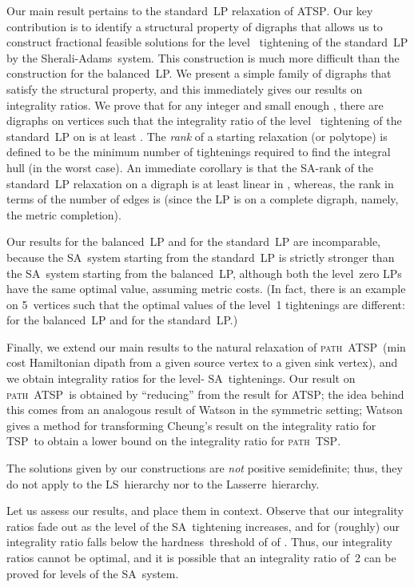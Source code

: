 \documentclass[11pt]{article}
\newcommand{\sa}{\textsf{Sherali-Adams}}
\newcommand{\la}{\textsf{Lasserre}}
\newcommand{\iLSp}{\textsf{LS}}
\newcommand{\iSA}{\textsf{SA}}
\newcommand{\tsp}{\textsc{TSP}}
\newcommand{\atsp}{\textsc{ATSP}}
\newcommand{\pathtsp}{\textsc{path~TSP}}
\newcommand{\pathatsp}{\textsc{path~ATSP}}
\begin{document}
Our main result pertains to the standard~LP relaxation of \atsp.
Our key contribution is to identify
a structural property of digraphs that
allows us to construct fractional feasible solutions
for the level~ tightening of the standard~LP by the \sa\ system.
This construction is much more difficult than the
construction for the balanced~LP.
We present a simple family of digraphs that
satisfy the structural property, and this immediately
gives our results on integrality ratios.
We prove that for any integer  and small enough ,
there are digraphs  on  vertices
such that the integrality ratio of
the level~ tightening of the standard~LP on 
is at least .
The \textit{rank} of a starting relaxation (or polytope)
is defined to be the minimum number of tightenings
required to find the integral hull (in the worst case).
An immediate corollary is that
the \iSA-rank of the standard~LP relaxation on a digraph 
is at least linear in , whereas,
the rank in terms of the number of edges is 
(since the LP is on a complete digraph, namely, the metric completion).

Our results for the balanced~LP and for the standard~LP
are incomparable, because
the \iSA\ system starting from the standard~LP
is strictly stronger than
the \iSA\ system starting from the balanced~LP,
although both the level~zero LPs have the
same optimal value, assuming metric costs.
(In fact, there is an example on 5~vertices
\cite[Figure~4.4,~p.60]{paulthesis08} such that
the optimal values of the level~1 tightenings are different:
 for the balanced~LP and  for the standard~LP.)

Finally, we extend our main results to the natural relaxation of
\pathatsp\ (min cost Hamiltonian dipath from a given source vertex to a
given sink vertex), and
we obtain integrality ratios  for the level-
\iSA\ tightenings.
Our result on \pathatsp\ is obtained by ``reducing'' from the result
for \atsp; the idea behind this comes from an analogous result of
Watson \cite{watson11} in the symmetric setting; Watson gives a method
for transforming Cheung's \cite{cheung05} result on the integrality
ratio for \tsp\ to obtain a lower bound on the integrality ratio for
\pathtsp.


The solutions given by our constructions are \textit{not}
positive semidefinite;
thus, they do not apply to the \iLSp\ hierarchy
nor to the \la\ hierarchy.

Let us assess our results, and place them in context.
Observe that our integrality ratios fade out as the
level of the \iSA\ tightening increases,
and for  (roughly)
our integrality ratio falls below the hardness~threshold of
 of \cite{KLS-isaac13}.
Thus, our integrality ratios cannot be optimal, and it is possible
that an integrality ratio of~2 can be proved for  levels
of the \iSA\ system.
\end{document}
